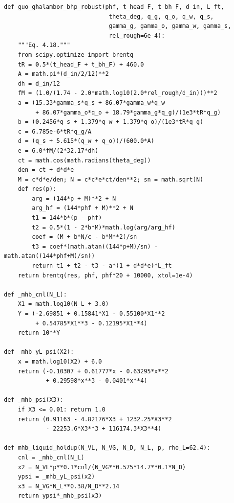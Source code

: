\documentclass[10pt,a4paper,openany]{book}
\begin{document}
\begin{lstlisting}
def guo_ghalambor_bhp_robust(phf, t_head_F, t_bh_F, d_in, L_ft,
                              theta_deg, q_g, q_o, q_w, q_s,
                              gamma_g, gamma_o, gamma_w, gamma_s,
                              rel_rough=6e-4):
    """Eq. 4.18."""
    from scipy.optimize import brentq
    tR = 0.5*(t_head_F + t_bh_F) + 460.0
    A = math.pi*(d_in/2/12)**2
    dh = d_in/12
    fM = (1.0/(1.74 - 2.0*math.log10(2.0*rel_rough/d_in)))**2
    a = (15.33*gamma_s*q_s + 86.07*gamma_w*q_w
         + 86.07*gamma_o*q_o + 18.79*gamma_g*q_g)/(1e3*tR*q_g)
    b = (0.2456*q_s + 1.379*q_w + 1.379*q_o)/(1e3*tR*q_g)
    c = 6.785e-6*tR*q_g/A
    d = (q_s + 5.615*(q_w + q_o))/(600.0*A)
    e = 6.0*fM/(2*32.17*dh)
    ct = math.cos(math.radians(theta_deg))
    den = ct + d*d*e
    M = c*d*e/den; N = c*c*e*ct/den**2; sn = math.sqrt(N)
    def res(p):
        arg = (144*p + M)**2 + N
        arg_hf = (144*phf + M)**2 + N
        t1 = 144*b*(p - phf)
        t2 = 0.5*(1 - 2*b*M)*math.log(arg/arg_hf)
        coef = (M + b*N/c - b*M**2)/sn
        t3 = coef*(math.atan((144*p+M)/sn) - math.atan((144*phf+M)/sn))
        return t1 + t2 - t3 - a*(1 + d*d*e)*L_ft
    return brentq(res, phf, phf*20 + 10000, xtol=1e-4)

def _mhb_cnl(N_L):
    X1 = math.log10(N_L + 3.0)
    Y = (-2.69851 + 0.15841*X1 - 0.55100*X1**2
         + 0.54785*X1**3 - 0.12195*X1**4)
    return 10**Y

def _mhb_yL_psi(X2):
    x = math.log10(X2) + 6.0
    return (-0.10307 + 0.61777*x - 0.63295*x**2
            + 0.29598*x**3 - 0.0401*x**4)

def _mhb_psi(X3):
    if X3 <= 0.01: return 1.0
    return (0.91163 - 4.82176*X3 + 1232.25*X3**2
            - 22253.6*X3**3 + 116174.3*X3**4)

def mhb_liquid_holdup(N_VL, N_VG, N_D, N_L, p, rho_L=62.4):
    cnl = _mhb_cnl(N_L)
    x2 = N_VL*p**0.1*cnl/(N_VG**0.575*14.7**0.1*N_D)
    ypsi = _mhb_yL_psi(x2)
    x3 = N_VG*N_L**0.38/N_D**2.14
    return ypsi*_mhb_psi(x3)


\end{lstlisting}
\end{document}
